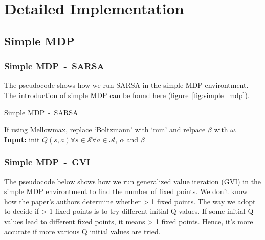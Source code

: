 \section{Detailed Implementation}\label{section:implementation}


\subsection{Simple MDP}

\subsubsection{Simple MDP\ -\ SARSA}

The pseudocode shows how we run SARSA in the simple MDP environtment.
The introduction of simple MDP can be found here (figure\ \ref{fig:simple_mdp}).

\begin{algorithm}
    \caption{Simple MDP\ -\ SARSA}\label{alg:SimpleMDP-SARSA}
    If using Mellowmax, replace `Boltzmann' with `mm' and relpace $\beta$ with $\omega$.\\
    \textbf{Input:} init $Q(s,a) \forall s\in \mathcal{S} \forall a\in \mathcal{A}$, $\alpha$ and $\beta$
    \begin{algorithmic}[1]
            \Repeat{}
        \EndFor{}
    \end{algorithmic}
\end{algorithm}

\subsubsection{Simple MDP\ -\ GVI}\label{sec:simpleMDP_GVI}

The pseudocode below shows how we run generalized value iteration (GVI) in the simple MDP environtment to find the number of fixed points.
We don't know how the paper's authors determine whether > 1 fixed points.
The way we adopt to decide if > 1 fixed points is to try different initial Q values.
If some initial Q values lead to different fixed points, it means > 1 fixed points.
Hence, it's more accurate if more various Q initial values are tried.

